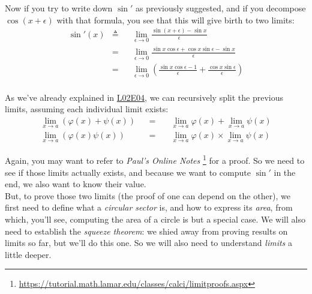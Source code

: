 \documentclass[solutions.tex]{subfiles}
\begin{document}
Now if you try to write down $\sin'$ as previously suggested,
and if you decompose $\cos(x+\epsilon)$ with that formula, you see
that this will give birth to two limits:
\begin{equation*} \begin{aligned}
	\sin'(x) &\triangleq&& \lim_{\epsilon \rightarrow 0}
		\frac{\sin(x+\epsilon)-\sin x}{\epsilon} \\
	~ &=&& \lim_{\epsilon \rightarrow 0}
		\frac{\sin x\cos\epsilon+\cos x\sin\epsilon-\sin x}{\epsilon} \\
	~ &=&& \lim_{\epsilon \rightarrow 0}\left(
		\frac{\sin x\cos\epsilon-1}{\epsilon}+\frac{\cos x\sin\epsilon}{\epsilon}
		\right) \\
\end{aligned} \end{equation*}

As we've already explained in
\href{https://github.com/mbivert/ttm/blob/master/cm/L02E04.pdf}{L02E04},
we can recursively split the previous limits, assuming each individual
limit exists:
\begin{equation*} \begin{aligned}
	\lim_{x \rightarrow a}\left(\varphi(x)+\psi(x)\right) &&=\quad&
		\lim_{x \rightarrow a}\varphi(x)
		+ \lim_{x \rightarrow a}\psi(x) \\
	\lim_{x \rightarrow a}\left(\varphi(x)\psi(x)\right) &&=\quad&
		\lim_{x \rightarrow a}\varphi(x)
		\times\lim_{x \rightarrow a}\psi(x)
\end{aligned} \end{equation*}

Again, you may want to refer to \textit{Paul's Online Notes}
\footnote{\url{https://tutorial.math.lamar.edu/classes/calci/limitproofs.aspx}}
for a proof. So we need to see if those limits actually exists, and
because we want to compute $\sin'$ in the end, we also want to know
their value. \\


But, to prove those two limits (the proof of one can depend on the
other), we first need to define what a \textit{circular sector} is,
and how to express its \textit{area}, from which, you'll see, computing
the area of a circle is but a special case. We will also need to establish
the \textit{squeeze theorem}: we shied away from proving results on limits
so far, but we'll do this one. So we will also need to understand
\textit{limits} a little deeper. \\
\end{document}
